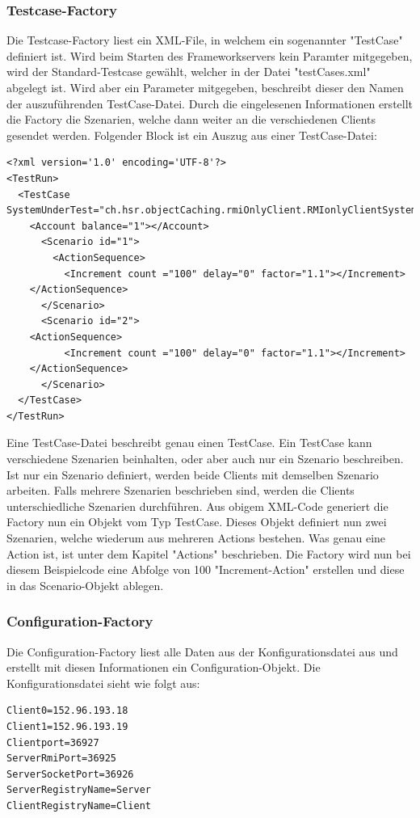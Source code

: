 \subsubsection{Testcase-Factory}
\label{sec:testCaseFactory}
Die Testcase-Factory liest ein XML-File, in welchem ein sogenannter "TestCase" definiert ist. Wird beim Starten des Frameworkservers kein Paramter mitgegeben, wird der Standard-Testcase gewählt, welcher in der Datei "testCases.xml" abgelegt ist. Wird aber ein Parameter mitgegeben, beschreibt dieser den Namen der auszuführenden TestCase-Datei.\newline
Durch die eingelesenen Informationen erstellt die Factory die Szenarien, welche dann weiter an die verschiedenen Clients gesendet werden. Folgender Block ist ein Auszug aus einer TestCase-Datei:

\begin{lstlisting}
<?xml version='1.0' encoding='UTF-8'?>
<TestRun>
  <TestCase SystemUnderTest="ch.hsr.objectCaching.rmiOnlyClient.RMIonlyClientSystem">
    <Account balance="1"></Account>
      <Scenario id="1">
        <ActionSequence>
          <Increment count ="100" delay="0" factor="1.1"></Increment>
	</ActionSequence>
      </Scenario>
      <Scenario id="2">
	<ActionSequence>
          <Increment count ="100" delay="0" factor="1.1"></Increment>
	</ActionSequence>
      </Scenario>
  </TestCase>
</TestRun>
\end{lstlisting}

Eine TestCase-Datei beschreibt genau einen TestCase. Ein TestCase kann verschiedene Szenarien beinhalten, oder aber auch nur ein Szenario beschreiben. Ist nur ein Szenario definiert, werden beide Clients mit demselben Szenario arbeiten. Falls mehrere Szenarien beschrieben sind, werden die Clients unterschiedliche Szenarien durchführen. \newline
Aus obigem XML-Code generiert die Factory nun ein Objekt vom Typ TestCase. Dieses Objekt definiert nun zwei Szenarien, welche wiederum aus mehreren Actions bestehen. Was genau eine Action ist, ist unter dem Kapitel "Actions" beschrieben. Die Factory wird nun bei diesem Beispielcode eine Abfolge von 100 "Increment-Action" erstellen und diese in das Scenario-Objekt ablegen.


\subsubsection{Configuration-Factory}
\label{sec:configurationFactory}
Die Configuration-Factory liest alle Daten aus der Konfigurationsdatei aus und erstellt mit diesen Informationen ein Configuration-Objekt. Die Konfigurationsdatei sieht wie folgt aus:
\begin{lstlisting}
Client0=152.96.193.18
Client1=152.96.193.19
Clientport=36927
ServerRmiPort=36925
ServerSocketPort=36926
ServerRegistryName=Server
ClientRegistryName=Client
\end{lstlisting}

